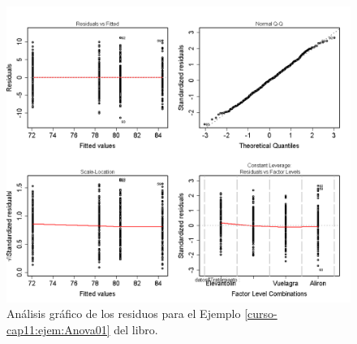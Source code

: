 \documentclass[10pt,a4paper]{article}\usepackage[]{graphicx}\usepackage[]{color}
\begin{document}
\begin{figure}[htb]
\begin{center}
    \includegraphics[width=15cm]{../fig/Tut11-03.png}
\end{center}
\caption{Análisis gráfico de los residuos para el Ejemplo \ref{curso-cap11:ejem:Anova01} del libro.}
\label{tut11:fig:AnalisisResiduosEjemploAnova}
\end{figure}
\end{document}
